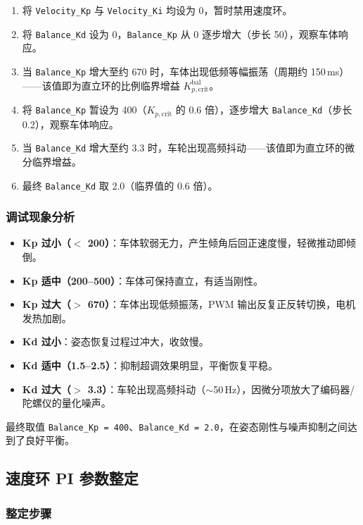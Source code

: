 \documentclass[12pt,a4paper,UTF8]{ctexrep}
\begin{document}
\begin{enumerate}
  \item 将 \texttt{Velocity\_Kp} 与 \texttt{Velocity\_Ki} 均设为 0，暂时禁用速度环。
  \item 将 \texttt{Balance\_Kd} 设为 0，\texttt{Balance\_Kp} 从 0 逐步增大（步长 50），观察车体响应。
  \item 当 \texttt{Balance\_Kp} 增大至约 670 时，车体出现低频等幅振荡（周期约 150\,ms）——该值即为直立环的比例临界增益 $K_{p,\text{crit}}^{\text{bal}}$。
  \item 将 \texttt{Balance\_Kp} 暂设为 400（$K_{p,\text{crit}}$ 的 0.6 倍），逐步增大 \texttt{Balance\_Kd}（步长 0.2），观察车体响应。
  \item 当 \texttt{Balance\_Kd} 增大至约 3.3 时，车轮出现高频抖动——该值即为直立环的微分临界增益。
  \item 最终 \texttt{Balance\_Kd} 取 2.0（临界值的 0.6 倍）。
\end{enumerate}

\subsubsection{调试现象分析}

\begin{itemize}
  \item \textbf{Kp 过小（$<$ 200）}：车体软弱无力，产生倾角后回正速度慢，轻微推动即倾倒。
  \item \textbf{Kp 适中（200–500）}：车体可保持直立，有适当刚性。
  \item \textbf{Kp 过大（$>$ 670）}：车体出现低频振荡，PWM 输出反复正反转切换，电机发热加剧。
  \item \textbf{Kd 过小}：姿态恢复过程过冲大，收敛慢。
  \item \textbf{Kd 适中（1.5–2.5）}：抑制超调效果明显，平衡恢复平稳。
  \item \textbf{Kd 过大（$>$ 3.3）}：车轮出现高频抖动（$\sim$50\,Hz），因微分项放大了编码器/陀螺仪的量化噪声。
\end{itemize}

最终取值 \texttt{Balance\_Kp = 400}、\texttt{Balance\_Kd = 2.0}，在姿态刚性与噪声抑制之间达到了良好平衡。

\subsection{速度环 PI 参数整定}

\subsubsection{整定步骤}
\end{document}
